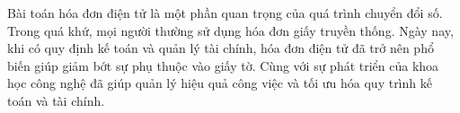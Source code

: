 Bài toán hóa đơn điện tử là một phần quan trọng của quá trình chuyển đổi số. Trong quá khứ, mọi người thường sử dụng hóa đơn giấy truyền thống. Ngày nay, khi có quy định kế toán và quản lý tài chính, hóa đơn điện tử đã trở nên phổ biến giúp giảm bớt sự phụ thuộc vào giấy tờ. Cùng với sự phát triển của khoa học công nghệ đã giúp quản lý hiệu quả công việc và tối ưu hóa quy trình kế toán và tài chính.

